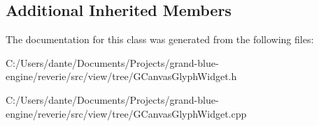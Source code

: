 \subsection*{Additional Inherited Members}


The documentation for this class was generated from the following files\+:\begin{DoxyCompactItemize}
\item 
C\+:/\+Users/dante/\+Documents/\+Projects/grand-\/blue-\/engine/reverie/src/view/tree/G\+Canvas\+Glyph\+Widget.\+h\item 
C\+:/\+Users/dante/\+Documents/\+Projects/grand-\/blue-\/engine/reverie/src/view/tree/G\+Canvas\+Glyph\+Widget.\+cpp\end{DoxyCompactItemize}
